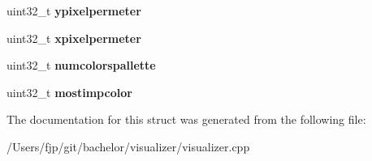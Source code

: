 \begin{DoxyCompactItemize}
uint32\+\_\+t {\bfseries ypixelpermeter}
\item 
\mbox{\label{structvisualizer_1_1_bitmap_info_header_a55f795ae6a8f855cbc3a9cad8d69b091}} 
uint32\+\_\+t {\bfseries xpixelpermeter}
\item 
\mbox{\label{structvisualizer_1_1_bitmap_info_header_a828bf1dbc3f160913e1a835ad007056b}} 
uint32\+\_\+t {\bfseries numcolorspallette}
\item 
\mbox{\label{structvisualizer_1_1_bitmap_info_header_a3569cfb8679eec61adfa907348e5c898}} 
uint32\+\_\+t {\bfseries mostimpcolor}
\end{DoxyCompactItemize}


The documentation for this struct was generated from the following file\+:\begin{DoxyCompactItemize}
\item 
/\+Users/fjp/git/bachelor/visualizer/visualizer.\+cpp\end{DoxyCompactItemize}
